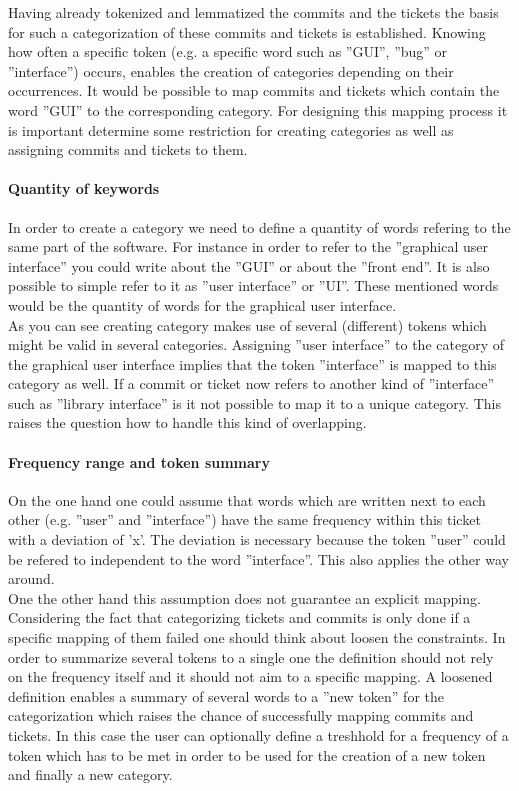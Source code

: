Having already tokenized and lemmatized the commits and the tickets the basis for such a categorization of these commits and tickets is established. Knowing how often a specific token (e.g. a specific word such as ''GUI'', ''bug'' or ''interface'') occurs, enables the creation of categories  depending on their occurrences. It would be possible to map commits and tickets which contain the word ''GUI'' to the corresponding category. For designing this mapping process it is important determine some restriction for creating categories as well as assigning commits and tickets to them. 

\paragraph{Quantity of keywords}

In order to create a category we need to define a quantity of words refering to the same part of the software. For instance in order to refer to the ''graphical user interface'' you could write about the ''GUI'' or about the ''front end''. It is also possible to simple refer to it as ''user interface'' or ''UI''. These mentioned words would be the quantity of words for the graphical user interface. \\
As you can see creating category makes use of several (different) tokens which might be valid in several categories. Assigning ''user interface'' to the category of the graphical user interface implies that the token ''interface'' is mapped to this category as well. If a commit or ticket now refers to another kind of ''interface'' such as ''library interface'' is it not possible to map it to a unique category. This raises the question how to handle this kind of overlapping. 

\paragraph{Frequency range and token summary}

On the one hand one could assume that words which are written next to each other (e.g. ''user'' and  ''interface'') have the same frequency within this ticket with a deviation of 'x'. The deviation is necessary because the token ''user'' could be refered to independent to the word ''interface''. This also applies the other way around. \\
One the other hand this assumption does not guarantee an explicit mapping. Considering the fact that categorizing tickets and commits is only done if a specific mapping of them failed one should think about loosen the constraints.
In order to summarize several tokens to a single one the definition should not rely on the frequency itself and it should not aim to a specific mapping. A loosened definition enables a summary of several words to a ''new token'' for the categorization which raises the chance of successfully mapping commits and tickets. In this case the user can optionally define a treshhold for a frequency of a token which has to be met in order to be used for the creation of a new token and finally a new category.



